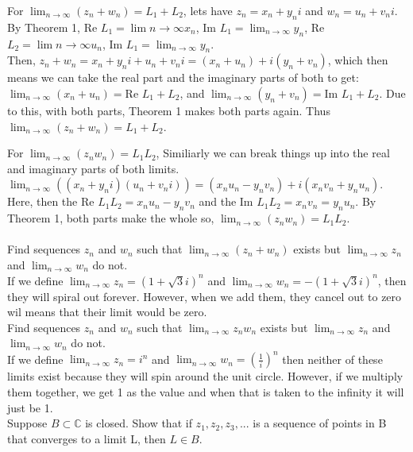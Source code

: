 \documentclass[12pt]{article}
\begin{document}
For $\lim_{n\to\infty} (z_n + w_n) = L_1 + L_2$, 
lets have $z_n = x_n + y_ni$ and $w_n = u_n + v_ni$.
By Theorem 1, Re $L_1 = \lim{n\to\infty} x_n $, Im $L_1 = \lim_{n\to\infty} y_n$, Re $L_2 = \lim{n\to\infty} u_n$, Im $L_1 = \lim_{n\to\infty} y_n$.\\

Then, $z_n + w_n = x_n + y_ni + u_n + v_ni = (x_n+u_n) + i(y_n+v_n)$, which then means we can take the real part and the imaginary parts of both to get:
$\lim_{n\to\infty} (x_n+u_n) = $Re $ L_1 + L_2$, and $\lim_{n\to\infty} (y_n+v_n) = $Im $ L_1 + L_2$.
Due to this, with both parts, Theorem 1 makes both parts again. 
Thus $\lim_{n\to\infty} (z_n + w_n) = L_1 + L_2$. 


For $\lim_{n\to\infty} (z_nw_n) = L_1L_2$,
Similiarly we can break things up into the real and imaginary parts of both limits.
$\lim_{n\to\infty} ((x_n+y_ni)(u_n+v_ni)) = (x_nu_n - y_nv_n) + i(x_nv_n + y_nu_n)$.
Here, then the Re $L_1L_2 = x_nu_n - y_nv_n$ and the Im $L_1L_2 = x_nv_n = y_nu_n$. 
By Theorem 1, both parts make the whole so, $\lim_{n\to\infty} (z_nw_n) = L_1L_2$.\\


 \\

 Find sequences $z_n$ and $w_n$ such that $\lim_{n\to\infty} (z_n + w_n)$ exists but $\lim_{n\to\infty} z_n$ and  $\lim_{n\to\infty} w_n$ do not.\\

If we define $\lim_{n\to\infty} z_n = (1 + \sqrt{3}i)^n$ and $\lim_{n\to\infty} w_n = -(1 + \sqrt{3}i)^n$, then they will spiral out forever.
However, when we add them, they cancel out to zero wil means that their limit would be zero.\\

 Find sequences $z_n$ and $w_n$ such that $\lim_{n\to\infty} z_nw_n$ exists but $\lim_{n\to\infty} z_n$ and  $\lim_{n\to\infty} w_n$ do not.\\

If we define $\lim_{n\to\infty} z_n = i^n$ and $\lim_{n\to\infty} w_n = (\frac{1}{i})^n$ then neither of these limits exist because they will spin around the unit circle.
However, if we multiply them together, we get 1 as the value and when that is taken to the infinity it will just be 1.\\


 Suppose $B \subset \mathbb{C}$ is closed. Show that if $z_1,z_2,z_3,...$ is a sequence of points in B that converges to a limit L, then $L \in B$.\\
\end{document}
